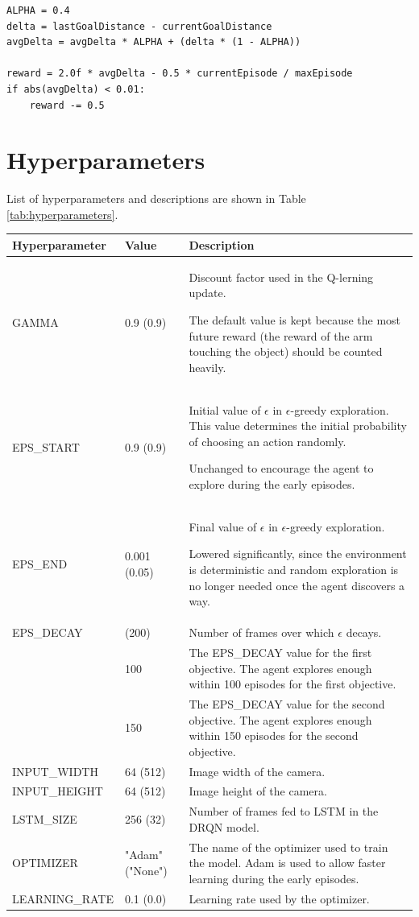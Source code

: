 \documentclass[a4paper]{article}
\begin{document}
\begin{verbatim}
ALPHA = 0.4
delta = lastGoalDistance - currentGoalDistance
avgDelta = avgDelta * ALPHA + (delta * (1 - ALPHA))

reward = 2.0f * avgDelta - 0.5 * currentEpisode / maxEpisode
if abs(avgDelta) < 0.01:
	reward -= 0.5
\end{verbatim}

\section{Hyperparameters}
List of hyperparameters and descriptions are shown in Table \ref{tab:hyperparameters}.

\begin{table}[htp]
\centering
\begin{tabular}{p{3.5cm}|p{1.5cm}|p{8.5cm}}
Hyperparameter & Value & Description \\
\hline
GAMMA & 0.9 (0.9) & Discount factor used in the Q-lerning \cite{Watkins92q-learning} update.

The default value is kept because the most future reward (the reward of the arm touching the object) should be counted heavily. \\
EPS\_START & 0.9 (0.9) & Initial value of \(\epsilon\) in \(\epsilon\)-greedy exploration. This value determines the initial probability of choosing an action randomly.

Unchanged to encourage the agent to explore during the early episodes. \\
EPS\_END & 0.001 (0.05) & Final value of \(\epsilon\) in \(\epsilon\)-greedy exploration.

Lowered significantly, since the environment is deterministic and random exploration is no longer needed once the agent discovers a way. \\
EPS\_DECAY & (200) & Number of frames over which  \(\epsilon\) decays. \\
 & 100 & The EPS\_DECAY value for the first objective. The agent explores enough within 100 episodes for the first objective. \\
 & 150 & The EPS\_DECAY value for the second objective.  The agent explores enough within 150 episodes for the second objective. \\
INPUT\_WIDTH & 64 (512) & Image width of the camera. \\
INPUT\_HEIGHT & 64 (512) & Image height of the camera. \\
LSTM\_SIZE & 256 (32) & Number of frames fed to LSTM \cite{Hochreiter:1997:LSM:1246443.1246450} in the DRQN model. \\
OPTIMIZER & "Adam" ("None") & The name of the optimizer used to train the model. Adam \cite{DBLP:journals/corr/KingmaB14} is used to allow faster learning during the early episodes. \\
LEARNING\_RATE & 0.1 (0.0) & Learning rate used by the optimizer.


\end{tabular}
\end{table}
\end{document}
